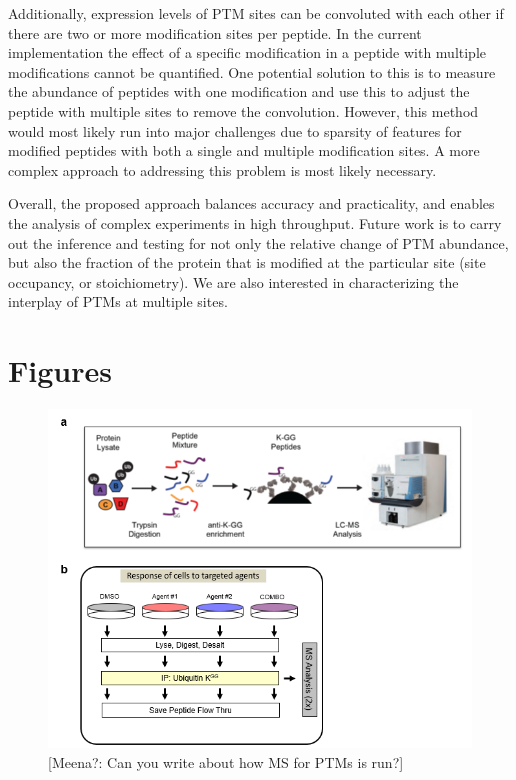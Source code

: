 \documentclass[mcp]{article}
\numberwithin{figure}{section} %
\numberwithin{table}{section}
\def\todo#1{{\color{red}[#1]}}
\begin{document}
Additionally, expression levels of PTM sites can be convoluted with each other if there are two or more modification sites per peptide. In the current implementation the effect of a specific modification in a peptide with multiple modifications cannot be quantified. One potential solution to this is to measure the abundance of peptides with one modification and use this to adjust the peptide with multiple sites to remove the convolution. However, this method would most likely run into major challenges due to sparsity of features for modified peptides with both a single and multiple modification sites. A more complex approach to addressing this problem is most likely necessary.

Overall, the proposed approach balances accuracy and practicality, and enables the analysis of complex experiments in high throughput. Future work is to carry out the inference and testing for not only the relative change of PTM abundance, but also the fraction of the protein that is modified at the particular site (site occupancy, or stoichiometry). We are also interested in characterizing the interplay of PTMs at multiple sites. 

\newpage
\printbibliography


\newpage
\section{Figures}

\begin{figure}[ht]
\centering
\includegraphics[scale=.8]{images/fig1.png}
\caption{\todo{Meena?: Can you write about how MS for PTMs is run?}}
\label{fig:workflow}
\end{figure}
\end{document}
